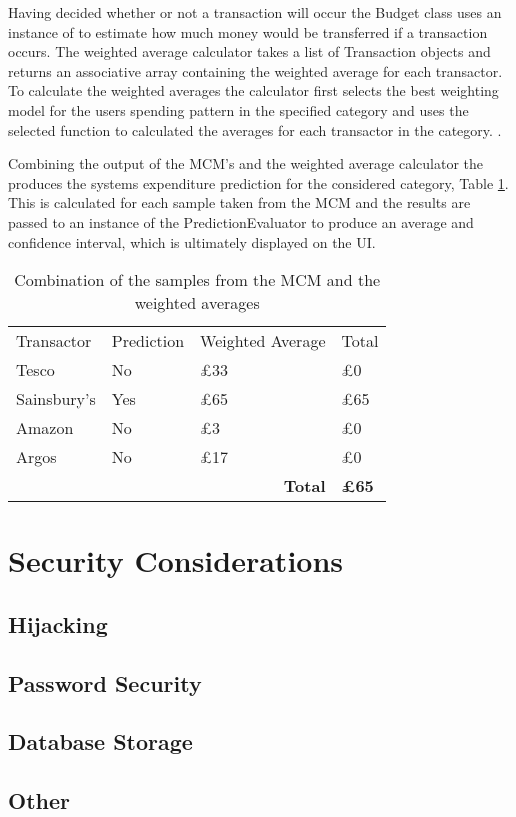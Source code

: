 Having decided whether or not a transaction will occur the Budget class uses an instance of  to estimate how much money would be transferred if a transaction occurs. The weighted average calculator takes a list of Transaction objects and returns an associative array containing the weighted average for each transactor. To calculate the weighted averages the calculator first selects the best weighting model for the users spending pattern in the specified category and uses the selected function to calculated the averages for each transactor in the category. .

Combining the output of the MCM's and the weighted average calculator the produces the systems expenditure prediction for the considered category, Table \ref{fig:predictions-combined}. This is calculated for each sample taken from the MCM and the results are passed to an instance of the PredictionEvaluator to produce an average and confidence interval, which is ultimately displayed on the UI.

\begin{table}[h]
\centering
\begin{tabular}{llll}
Transactor  & Prediction & Weighted Average                   & Total        \\
Tesco       & No         & £33                                & £0           \\
Sainsbury's & Yes        & £65                                & £65          \\
Amazon      & No         & £3                                 & £0           \\
Argos       & No         & £17                                & £0           \\
            &            & \multicolumn{1}{r}{\textbf{Total}} & \textbf{£65}
\end{tabular}

\label{fig:predictions-combined}
\caption{Combination of the samples from the MCM and the weighted averages}
\end{table}

\section{Security Considerations}

\subsection{Hijacking}

\subsection{Password Security}

\subsection{Database Storage}

\subsection{Other}


